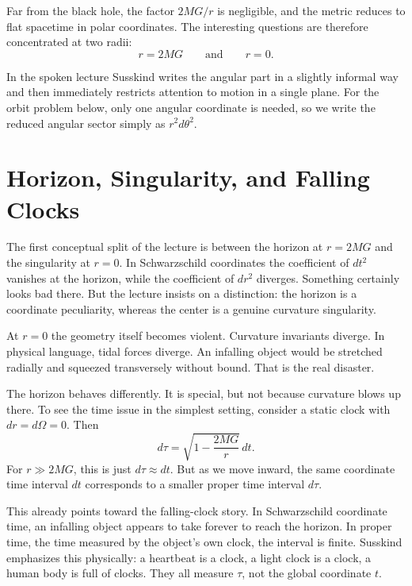Far from the black hole, the factor \(2MG/r\) is negligible, and the metric reduces to flat spacetime in polar coordinates. The interesting questions are therefore concentrated at two radii:
\begin{equation}
r=2MG
\qquad \text{and} \qquad
r=0.
\end{equation}

\begin{remark}
In the spoken lecture Susskind writes the angular part in a slightly informal way and then immediately restricts attention to motion in a single plane. For the orbit problem below, only one angular coordinate is needed, so we write the reduced angular sector simply as \(r^{2}d\theta^{2}\).
\end{remark}

\section{Horizon, Singularity, and Falling Clocks}

The first conceptual split of the lecture is between the horizon at \(r=2MG\) and the singularity at \(r=0\). In Schwarzschild coordinates the coefficient of \(dt^{2}\) vanishes at the horizon, while the coefficient of \(dr^{2}\) diverges. Something certainly looks bad there. But the lecture insists on a distinction: the horizon is a coordinate peculiarity, whereas the center is a genuine curvature singularity.

At \(r=0\) the geometry itself becomes violent. Curvature invariants diverge. In physical language, tidal forces diverge. An infalling object would be stretched radially and squeezed transversely without bound. That is the real disaster.

The horizon behaves differently. It is special, but not because curvature blows up there. To see the time issue in the simplest setting, consider a static clock with \(dr=d\Omega=0\). Then
\begin{equation}
d\tau
=
\sqrt{1-\frac{2MG}{r}}\,dt.
\end{equation}
For \(r\gg 2MG\), this is just \(d\tau\approx dt\). But as we move inward, the same coordinate time interval \(dt\) corresponds to a smaller proper time interval \(d\tau\).

This already points toward the falling-clock story. In Schwarzschild coordinate time, an infalling object appears to take forever to reach the horizon. In proper time, the time measured by the object's own clock, the interval is finite. Susskind emphasizes this physically: a heartbeat is a clock, a light clock is a clock, a human body is full of clocks. They all measure \(\tau\), not the global coordinate \(t\).

